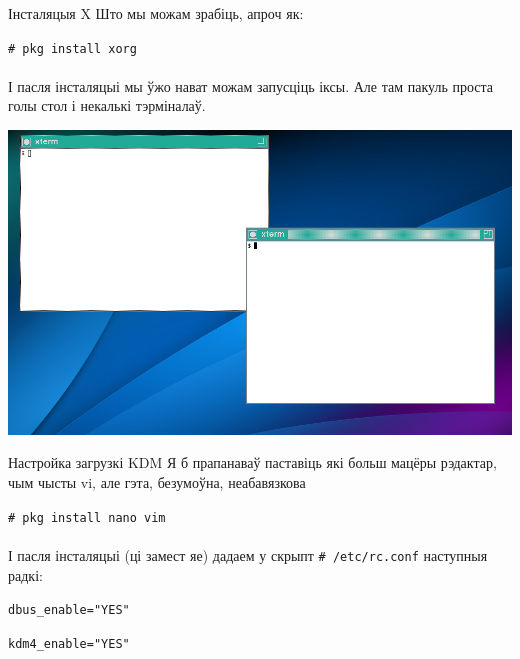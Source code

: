 \documentclass[ignorenonframetext,hyperref={pdftex,unicode}]{beamer}
\newcommand{\shellcmd}[1]{
\indent\indent\indent\texttt{\footnotesize\# #1}
}
\newcommand{\cfgline}[1]{
\indent\indent\indent\texttt{\footnotesize #1}
}
\begin{document}
\begin{frame}{Інсталяцыя X} %
	Што мы можам зрабіць, апроч як:

	\shellcmd{pkg install xorg} \pause
	\\~\\	
	І пасля інсталяцыі мы ўжо нават можам запусціць іксы. Але там пакуль проста голы стол і некалькі тэрміналаў.
	\begin{center}
 		\includegraphics[height=0.6\textheight,keepaspectratio]{TWM} %
	\end{center}
\end{frame} %

\begin{frame}{Настройка загрузкі KDM} %
	Я б прапанаваў паставіць які больш мацёры рэдактар, чым чысты vi, але гэта, безумоўна, неабавязкова

	\shellcmd{pkg install nano vim} \pause
	\\~\\	
	І пасля інсталяцыі (ці замест яе) дадаем у скрыпт \shellcmd{/etc/rc.conf} наступныя радкі:

	\cfgline{dbus\_enable="YES"}
	
	\cfgline{kdm4\_enable="YES"}
\end{frame} %
\end{document}
